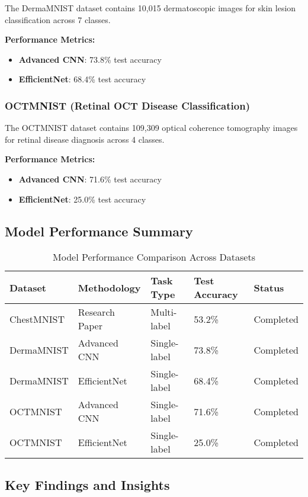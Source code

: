 \documentclass[12pt,a4paper]{article}
\begin{document}
The DermaMNIST dataset contains 10,015 dermatoscopic images for skin lesion classification across 7 classes.

\textbf{Performance Metrics:}
\begin{itemize}
    \item \textbf{Advanced CNN}: 73.8\% test accuracy
    \item \textbf{EfficientNet}: 68.4\% test accuracy
\end{itemize}

\subsubsection{OCTMNIST (Retinal OCT Disease Classification)}

The OCTMNIST dataset contains 109,309 optical coherence tomography images for retinal disease diagnosis across 4 classes.

\textbf{Performance Metrics:}
\begin{itemize}
    \item \textbf{Advanced CNN}: 71.6\% test accuracy
    \item \textbf{EfficientNet}: 25.0\% test accuracy
\end{itemize}

\subsection{Model Performance Summary}

\begin{table}[H]
\centering
\caption{Model Performance Comparison Across Datasets}
\begin{tabular}{@{}lllll@{}}
\toprule
\textbf{Dataset} & \textbf{Methodology} & \textbf{Task Type} & \textbf{Test Accuracy} & \textbf{Status} \\ \midrule
ChestMNIST & Research Paper & Multi-label & 53.2\% & Completed \\
DermaMNIST & Advanced CNN & Single-label & 73.8\% & Completed \\
DermaMNIST & EfficientNet & Single-label & 68.4\% & Completed \\
OCTMNIST & Advanced CNN & Single-label & 71.6\% & Completed \\
OCTMNIST & EfficientNet & Single-label & 25.0\% & Completed \\ \bottomrule
\end{tabular}
\end{table}

\subsection{Key Findings and Insights}
\end{document}
